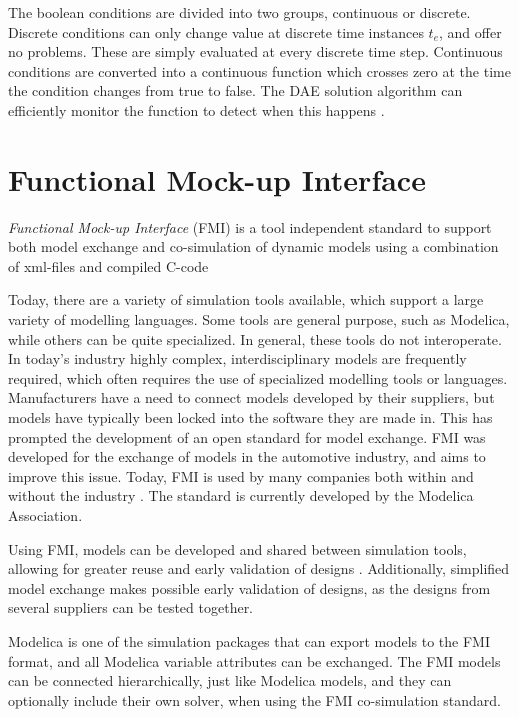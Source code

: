 \documentclass[\rootfolder/main.tex]{subfiles}
\begin{document}
The boolean conditions are divided into two groups, continuous or discrete.
Discrete conditions can only change value at discrete time instances $t_{e}$, and offer no problems.
These are simply evaluated at every discrete time step.
Continuous conditions are converted into a continuous function which crosses zero at the time the condition changes from true to false.
The DAE solution algorithm can efficiently monitor the function to detect when this happens \cite{openmodelica.org:lundvall:sims:2005}.

\section{Functional Mock-up Interface}

\begin{displayquote} \emph{Functional Mock-up Interface} (FMI) is a tool independent standard to support both model exchange and co-simulation of dynamic models using a combination of xml-files and compiled C-code
\end{displayquote}

Today, there are a variety of simulation tools available, which support a large variety of modelling languages.
Some tools are general purpose, such as Modelica, while others can be quite specialized.
In general, these tools do not interoperate.
In today's industry highly complex, interdisciplinary models are frequently required, which often requires the use of specialized modelling tools or languages.
Manufacturers have a need to connect models developed by their suppliers, but models have typically been locked into the software they are made in.  This has prompted the development of an open standard for model exchange.
FMI was developed for the exchange of models in the automotive industry, and aims to improve this issue.
Today, FMI is used by many companies both within and without the industry \cite{fmispecification}.
The standard is currently developed by the Modelica Association.

Using FMI, models can be developed and shared between simulation tools, allowing for greater reuse and early validation of designs \cite{Blochwitz2011}.
Additionally, simplified model exchange makes possible early validation of designs, as the designs from several suppliers can be tested together.

Modelica is one of the simulation packages that can export models to the FMI format, and all Modelica variable attributes can be exchanged.
The FMI models can be connected hierarchically, just like Modelica models, and they can optionally include their own solver, when using the FMI co-simulation standard.
\end{document}
